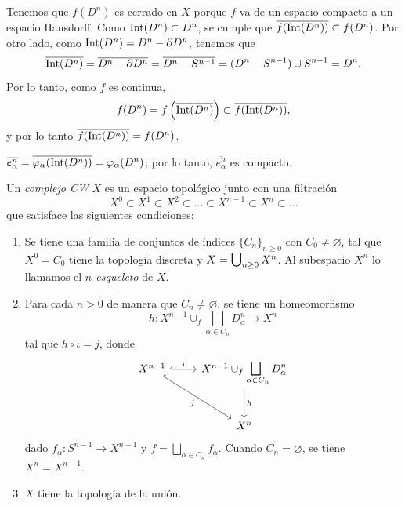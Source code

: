 \begin{dem}
Tenemos que $f(D^n)$ es cerrado en $X$ porque $f$ va de un espacio compacto a un espacio Hausdorff. Como $\mathrm{Int}(D^n) \subset D^n$, se cumple que $\overline{f(\mathrm{Int}(D^n))} \subset f(D^n)$. Por otro lado, como $\mathrm{Int}(D^n) = D^n - \partial D^n$, tenemos que
\[
\overline{\mathrm{Int}(D^n)} = \overline{D^n - \partial D^n} = \overline{D^n - S^{n-1}} = (D^n - S^{n-1}) \cup S^{n-1} = D^n.
\]
Por lo tanto, como $f$ es continua,
\[
f(D^n) = f\left(\overline{\mathrm{Int}(D^n)}\right) \subset \overline{f(\mathrm{Int}(D^n))},
\]
y por lo tanto $\overline{f(\mathrm{Int}(D^n))} = f(D^n)$.
\end{dem}

\begin{coro}
$\overline{e_\alpha^n} = \overline{\varphi_\alpha(\mathrm{Int}(D^n))} = \varphi_\alpha(D^n)$; por lo tanto, $\overline{e_\alpha^n}$ es compacto.
\end{coro}

\begin{definicion}
Un \textit{complejo CW} $X$ es un espacio topológico junto con una filtración
\[
X^0 \subset X^1 \subset X^2 \subset \dots \subset X^{n-1} \subset X^n \subset \dots
\]
que satisface las siguientes condiciones:
\begin{enumerate}[label=\arabic*)]
    \item Se tiene una familia de conjuntos de índices $\{C_n\}_{n \geq 0}$ con $C_0 \neq \varnothing$, tal que $X^0 = C_0$ tiene la topología discreta y $X = \medcup_{n \geq 0} X^n$. Al subespacio $X^n$ lo llamamos el \textit{$n$-esqueleto} de $X$.
    \item Para cada $n > 0$ de manera que $C_n \neq \varnothing$, se tiene un homeomorfismo
    \[
    h \colon X^{n-1} \cup_f \bigsqcup_{\alpha \in C_n} D_\alpha^n \longrightarrow X^n
    \]
    tal que $h \circ \iota = j$, donde
    \[
    \begin{tikzcd}[row sep=large, column sep=0.85cm]
    X^{n-1} \arrow[r, "i", hook] \arrow[dr, "j"', hook] & X^{n-1} \cup_f \displaystyle\medsqcup_{\alpha \in C_n} D_\alpha^n \arrow[d, "h"] \\
    & X^n
    \end{tikzcd}
    \]
    dado $f_\alpha \colon S^{n-1} \to X^{n-1}$ y $f = \bigsqcup_{\alpha \in C_n} f_\alpha$. Cuando $C_n = \varnothing$, se tiene $X^n = X^{n-1}$.
    \item $X$ tiene la topología de la unión.
\end{enumerate}
\end{definicion}

